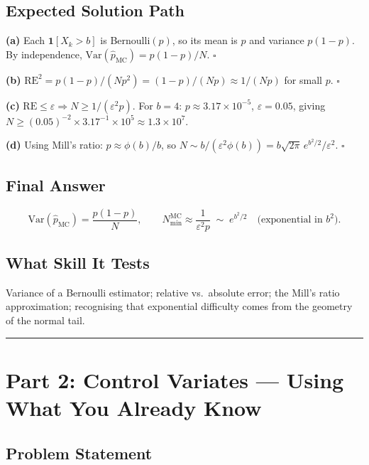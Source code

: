 \documentclass[12pt]{article}
\begin{document}
\subsection*{Expected Solution Path}

\textbf{(a)} Each $\mathbf{1}[X_k > b]$ is Bernoulli$(p)$, so its mean is $p$ and variance $p(1-p)$.
By independence, $\mathrm{Var}(\hat{p}_{\mathrm{MC}}) = p(1-p)/N$. \quad $\square$

\textbf{(b)} $\mathrm{RE}^2 = p(1-p)/(Np^2) = (1-p)/(Np) \approx 1/(Np)$ for small $p$. \quad $\square$

\textbf{(c)} $\mathrm{RE} \leq \varepsilon \Rightarrow N \geq 1/(\varepsilon^2 p)$.
For $b=4$: $p \approx 3.17 \times 10^{-5}$, $\varepsilon = 0.05$,
giving $N \geq (0.05)^{-2} \times 3.17^{-1} \times 10^5 \approx 1.3 \times 10^7$.

\textbf{(d)} Using Mill's ratio: $p \approx \phi(b)/b$,
so $N \sim b/(\varepsilon^2\phi(b)) = b\sqrt{2\pi}\,e^{b^2/2}/\varepsilon^2$. \quad $\square$

\subsection*{Final Answer}
\[
  \mathrm{Var}(\hat{p}_{\mathrm{MC}}) = \frac{p(1-p)}{N}, \qquad
  N^{\mathrm{MC}}_{\min} \approx \frac{1}{\varepsilon^2 p} \;\sim\; e^{b^2/2} \quad \text{(exponential in } b^2\text{)}.
\]

\subsection*{What Skill It Tests}
Variance of a Bernoulli estimator; relative vs.\ absolute error; the Mill's ratio approximation;
recognising that exponential difficulty comes from the geometry of the normal tail.

\bigskip\hrule\bigskip

\section*{\textcolor{sectionblue}{Part 2: Control Variates --- Using What You Already Know}}

\subsection*{Problem Statement}
\end{document}

